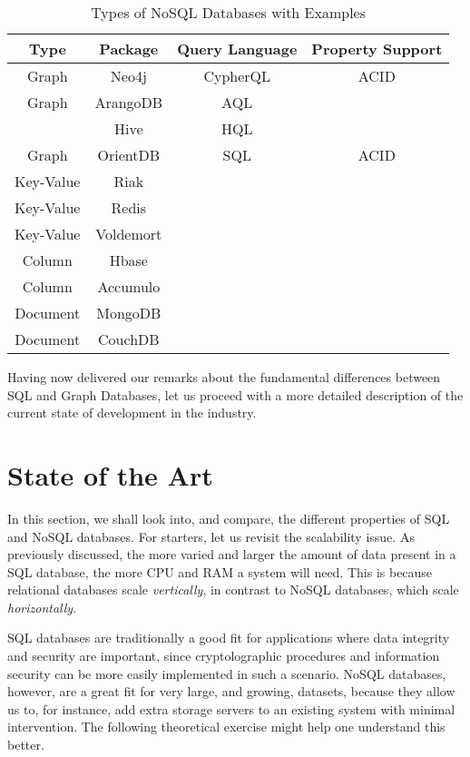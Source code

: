 \documentclass[10pt,        %
               a4paper,     %
               journal,     %
               ]{IEEEtran}
\begin{document}
\begin{table}[!t]
	\renewcommand{\arraystretch}{1.3} %
	\caption{Types of NoSQL Databases with Examples}
	\label{table_types_nosql}
	\centering
	\begin{tabular}{|c|c|c|c|}
		\hline
		Type & Package & Query Language & Property Support  \\
		\hline
		Graph & Neo4j & CypherQL & ACID \\
		\hline
		Graph & ArangoDB & AQL & \\
		\hline
		 & Hive & HQL & \\
		\hline
		Graph & OrientDB & SQL & ACID \\
		\hline
		Key-Value & Riak & &  \\
		\hline
		Key-Value & Redis & & \\
		\hline
		Key-Value & Voldemort & & \\
		\hline
		Column & Hbase & & \\
		\hline
		Column & Accumulo & & \\
		\hline
		Document & MongoDB & & \\
		\hline
		Document & CouchDB & & \\
		\hline
	\end{tabular}
\end{table}

Having now delivered our remarks about the fundamental differences between SQL and Graph Databases, let us proceed with a more detailed description of the current state of development in the industry.

\section{State of the Art}

In this section, we shall look into, and compare, the different properties of SQL and NoSQL databases. For starters, let us revisit the scalability issue. As previously discussed, the more varied and larger the amount of data present in a SQL database, the more CPU and RAM a system will need. This is because relational databases scale \textit{vertically}, in contrast to NoSQL databases, which scale \textit{horizontally}. \par
SQL databases are traditionally a good fit for applications where data integrity and security are important, since cryptolographic procedures and information security can be more easily implemented in such a scenario. NoSQL databases, however, are a great fit for very large, and growing, datasets, because they allow us to, for instance, add extra storage servers to an existing system with minimal intervention. The following theoretical exercise might help one understand this better. \par
\end{document}
